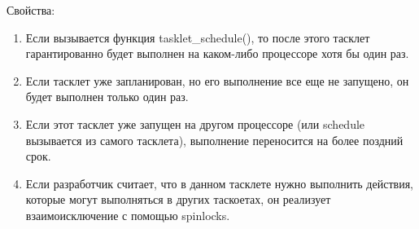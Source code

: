 Свойства:
\begin{enumerate}
	\item Если вызывается функция tasklet\_schedule(), то после этого тасклет гарантированно будет выполнен на каком-либо процессоре хотя бы один раз. 
	\item Если тасклет уже запланирован, но его выполнение все еще не запущено, он будет выполнен только один раз. 
	\item Если этот тасклет уже запущен на другом процессоре (или schedule вызывается из самого тасклета), выполнение переносится на более поздний срок. 
	\item Если разработчик считает, что в данном тасклете нужно выполнить действия, которые могут выполняться в других таскоетах, он реализует взаимоисключение с помощью spinlocks.
\end{enumerate}

